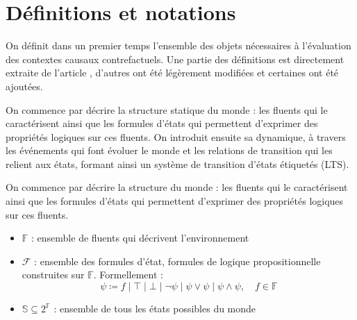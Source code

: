 \section{Définitions et notations}\label{def}
On définit dans un premier temps l'ensemble des objets nécessaires à l'évaluation des contextes causaux contrefactuels. Une partie des définitions est directement extraite de l'article \cite{sarmiento_formalising_2025}, d'autres ont été légèrement modifiées et certaines ont été ajoutées.

On commence par décrire la structure statique du monde : les fluents qui le caractérisent ainsi que les formules d'états qui permettent d'exprimer des propriétés logiques sur ces fluents. On
introduit ensuite sa dynamique, à travers les événements qui font évoluer le monde et les
relations de transition qui les relient aux états, formant ainsi un système de transition
d'états étiquetés (LTS).

On commence par décrire la structure du monde : les fluents qui le caractérisent ainsi que les formules d'états qui permettent d'exprimer des propriétés logiques sur ces fluents.
\begin{itemize}
    \item $\mathds{F}$ : ensemble de fluents qui décrivent l’environnement
    \item $\mathcal{F}$ : ensemble des formules d'état, formules de logique propositionnelle construites sur $\mathds{F}$. Formellement :
        \begin{equation}
        \psi \coloneqq f \mid \top \mid \bot \mid \neg \psi \mid \psi \vee \psi \mid \psi \wedge \psi, \quad f \in \mathds{F}
        \end{equation}
        \item $\mathds{S} \subseteq 2^{\mathds{F}}$ : ensemble de tous les états possibles du monde
    \end{itemize}

